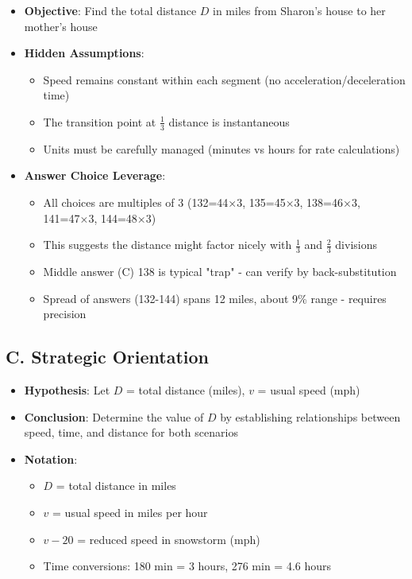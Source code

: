 \documentclass[11pt]{article}
\begin{document}
\begin{problemconfigbox}
\begin{itemize}[leftmargin=*]
    \item \textbf{Objective}: Find the total distance $D$ in miles from Sharon's house to her mother's house
    
    \item \textbf{Hidden Assumptions}: 
    \begin{itemize}[leftmargin=*]
        \item Speed remains constant within each segment (no acceleration/deceleration time)
        \item The transition point at $\frac{1}{3}$ distance is instantaneous
        \item Units must be carefully managed (minutes vs hours for rate calculations)
    \end{itemize}
    
    \item \textbf{Answer Choice Leverage}: 
    \begin{itemize}[leftmargin=*]
        \item All choices are multiples of 3 (132=44×3, 135=45×3, 138=46×3, 141=47×3, 144=48×3)
        \item This suggests the distance might factor nicely with $\frac{1}{3}$ and $\frac{2}{3}$ divisions
        \item Middle answer (C) 138 is typical "trap" - can verify by back-substitution
        \item Spread of answers (132-144) spans 12 miles, about 9\% range - requires precision
    \end{itemize}
\end{itemize}

\subsection*{C. Strategic Orientation}
\begin{itemize}[leftmargin=*]
    \item \textbf{Hypothesis}: Let $D$ = total distance (miles), $v$ = usual speed (mph)
    
    \item \textbf{Conclusion}: Determine the value of $D$ by establishing relationships between speed, time, and distance for both scenarios
    
    \item \textbf{Notation}: 
    \begin{itemize}[leftmargin=*]
        \item $D$ = total distance in miles
        \item $v$ = usual speed in miles per hour
        \item $v - 20$ = reduced speed in snowstorm (mph)
        \item Time conversions: 180 min = 3 hours, 276 min = 4.6 hours
    \end{itemize}
    

\end{itemize}
\end{problemconfigbox}
\end{document}
